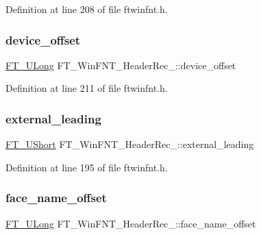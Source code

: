 Definition at line 208 of file ftwinfnt.\+h.

\mbox{\label{struct_f_t___win_f_n_t___header_rec___ac08c8a2bd1d558b10e61dba92b838666}} 
\subsubsection{\texorpdfstring{device\_offset}{device\_offset}}
{\footnotesize\ttfamily \mbox{\hyperlink{fttypes_8h_a4fac88bdba78eb76b505efa6e4fbf3f5}{F\+T\+\_\+\+U\+Long}} F\+T\+\_\+\+Win\+F\+N\+T\+\_\+\+Header\+Rec\+\_\+\+::device\+\_\+offset}



Definition at line 211 of file ftwinfnt.\+h.

\mbox{\label{struct_f_t___win_f_n_t___header_rec___a84e93c435a7a243f6a4afa96b5d34747}} 
\subsubsection{\texorpdfstring{external\_leading}{external\_leading}}
{\footnotesize\ttfamily \mbox{\hyperlink{fttypes_8h_a937f6c17cf5ffd09086d8610c37b9f58}{F\+T\+\_\+\+U\+Short}} F\+T\+\_\+\+Win\+F\+N\+T\+\_\+\+Header\+Rec\+\_\+\+::external\+\_\+leading}



Definition at line 195 of file ftwinfnt.\+h.

\mbox{\label{struct_f_t___win_f_n_t___header_rec___ab0848bbb97730f069c5434926ec7aa2d}} 
\subsubsection{\texorpdfstring{face\_name\_offset}{face\_name\_offset}}
{\footnotesize\ttfamily \mbox{\hyperlink{fttypes_8h_a4fac88bdba78eb76b505efa6e4fbf3f5}{F\+T\+\_\+\+U\+Long}} F\+T\+\_\+\+Win\+F\+N\+T\+\_\+\+Header\+Rec\+\_\+\+::face\+\_\+name\+\_\+offset}



